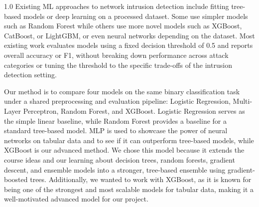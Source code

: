 \begin{spacing}{1.0}
Existing ML approaches to network intrusion detection include fitting tree-based models or
deep learning on a processed dataset. Some use simpler models such as Random Forest
while others use more novel models such as XGBoost, CatBoost, or LightGBM, or even
neural networks depending on the dataset. Most existing work evaluates models using a
fixed decision threshold of 0.5 and reports overall accuracy or F1, without breaking down
performance across attack categories or tuning the threshold to the specific
trade-offs of the intrusion detection setting.

Our method is to compare four models on the same binary classification
task under a shared preprocessing and evaluation pipeline: Logistic
Regression, Multi-Layer Perceptron, Random Forest, and XGBoost. Logistic
Regression serves as the simple linear baseline, while Random Forest provides a
baseline for a standard tree-based model. MLP is used to showcase the power of neural
networks on tabular data and to see if it can outperform tree-based models, while XGBoost
is our advanced method. We chose this model because it extends the course
ideas and our learning about decision trees, random forests, gradient descent, and ensemble models into a
stronger, tree-based ensemble using gradient-boosted trees. Additionally, we wanted to work with
XGBoost, as it is known for being one of the strongest and most scalable models for tabular data,
making it a well-motivated advanced model for our project.

\end{spacing}
\endgroup
